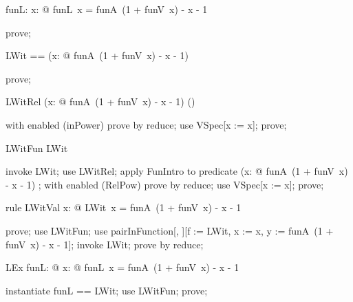 \documentclass{article}
\begin{document}
\begin{axdef}
  funL: \nat \fun \nat
\where
   \forall x: \nat @ funL~x = funA~(1 + funV~x) - x - 1
\end{axdef}

\begin{zproof}
prove;
\end{zproof}

\begin{zed}
  LWit == (\lambda x: \nat @ funA~(1 + funV~x) - x - 1)
\end{zed}

\begin{zproof}
prove;
\end{zproof}

\begin{theorem}{LWitRel}
  (\lambda x: \nat @ funA~(1 + funV~x) - x - 1) \in \power (\nat \cross \nat)
\end{theorem}

\begin{zproof}
with enabled (inPower) prove by reduce;
use VSpec[x := x];
prove;
\end{zproof}

\begin{theorem}{LWitFun}
  LWit \in \nat \fun \nat
\end{theorem}

\begin{zproof}
invoke LWit;
use LWitRel;
apply FunIntro to predicate (\lambda x: \nat @ funA~(1 + funV~x) - x - 1) \in \nat \fun \nat;
with enabled (RelPow) prove by reduce;
use VSpec[x := x];
prove;
\end{zproof}

\begin{theorem}{rule LWitVal}
  \forall x: \nat @ LWit~x = funA~(1 + funV~x) - x - 1
\end{theorem}

\begin{zproof}
prove;
use LWitFun;
use pairInFunction[\nat, \nat][f := LWit, x := x, y := funA~(1 + funV~x) - x - 1];
invoke LWit;
prove by reduce;
\end{zproof}

\begin{theorem}{LEx}
  \exists funL: \nat \fun \nat @ \forall x: \nat @ funL~x = funA~(1 + funV~x) - x - 1
\end{theorem}

\begin{zproof}
instantiate funL == LWit;
use LWitFun;
prove;
\end{zproof}
\end{document}
